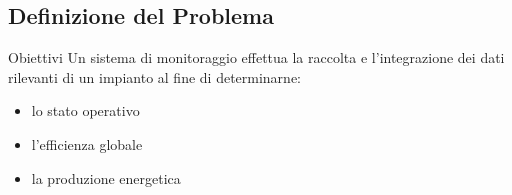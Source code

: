 \documentclass{beamer}
\newcommand{\red}[1]{\textcolor[rgb]{.8,0,0}{#1}}
\newcommand{\green}[1]{\textcolor[rgb]{0,.6,.1}{#1}}
\begin{document}
\subsection{Definizione del Problema}
\begin{frame}{Obiettivi}
Un sistema di monitoraggio effettua la \green{raccolta} e \green{l'integrazione} dei dati \red{rilevanti} di un impianto al fine di
determinarne:
%
\begin{itemize}
\item lo stato operativo
\item l'efficienza globale
\item la produzione energetica
\end{itemize}
%
\begin{figure}[!h]
  \begin{center}
  \end{center}
\end{figure}
%
\end{frame}
%













%
\end{document}
